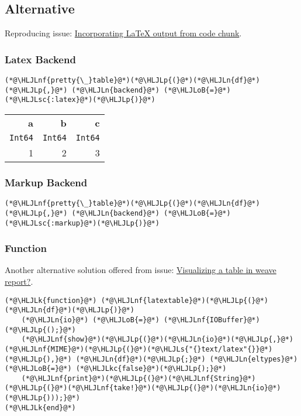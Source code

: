 \documentclass[12pt,a4paper]{article}
\newcommand{\HLJLk}[1]{\textcolor[RGB]{148,91,176}{\textbf{#1}}}
\newcommand{\HLJLkc}[1]{\textcolor[RGB]{59,151,46}{\textit{#1}}}
\newcommand{\HLJLn}[1]{#1}
\newcommand{\HLJLnf}[1]{\textcolor[RGB]{66,102,213}{#1}}
\newcommand{\HLJLs}[1]{\textcolor[RGB]{201,61,57}{#1}}
\newcommand{\HLJLsc}[1]{\textcolor[RGB]{201,61,57}{#1}}
\newcommand{\HLJLoB}[1]{\textcolor[RGB]{102,102,102}{\textbf{#1}}}
\newcommand{\HLJLp}[1]{#1}
\begin{document}
\subsection{Alternative}
Reproducing issue: \href{https://github.com/JunoLab/Weave.jl/issues/276}{Incorporating LaTeX output from code chunk}.

\subsubsection{Latex Backend}

\begin{lstlisting}
(*@\HLJLnf{pretty{\_}table}@*)(*@\HLJLp{(}@*)(*@\HLJLn{df}@*)(*@\HLJLp{,}@*) (*@\HLJLn{backend}@*) (*@\HLJLoB{=}@*) (*@\HLJLsc{:latex}@*)(*@\HLJLp{)}@*)
\end{lstlisting}

\begin{table}
  \begin{tabular}{rrr}
    \hline\hline
    \textbf{a} & \textbf{b} & \textbf{c} \\
    \texttt{Int64} & \texttt{Int64} & \texttt{Int64} \\\hline
    1 & 2 & 3 \\\hline\hline
  \end{tabular}
\end{table}


\subsubsection{Markup Backend}

\begin{lstlisting}
(*@\HLJLnf{pretty{\_}table}@*)(*@\HLJLp{(}@*)(*@\HLJLn{df}@*)(*@\HLJLp{,}@*) (*@\HLJLn{backend}@*) (*@\HLJLoB{=}@*) (*@\HLJLsc{:markup}@*)(*@\HLJLp{)}@*)
\end{lstlisting}


\subsubsection{Function}
Another alternative solution offered from issue: \href{https://github.com/JunoLab/Weave.jl/issues/200}{Visualizing a table in weave report?}.


\begin{lstlisting}
(*@\HLJLk{function}@*) (*@\HLJLnf{latextable}@*)(*@\HLJLp{(}@*)(*@\HLJLn{df}@*)(*@\HLJLp{)}@*)
    (*@\HLJLn{io}@*) (*@\HLJLoB{=}@*) (*@\HLJLnf{IOBuffer}@*)(*@\HLJLp{();}@*)
    (*@\HLJLnf{show}@*)(*@\HLJLp{(}@*)(*@\HLJLn{io}@*)(*@\HLJLp{,}@*) (*@\HLJLnf{MIME}@*)(*@\HLJLp{(}@*)(*@\HLJLs{"{}text/latex"{}}@*)(*@\HLJLp{),}@*) (*@\HLJLn{df}@*)(*@\HLJLp{;}@*) (*@\HLJLn{eltypes}@*) (*@\HLJLoB{=}@*) (*@\HLJLkc{false}@*)(*@\HLJLp{);}@*)
    (*@\HLJLnf{print}@*)(*@\HLJLp{(}@*)(*@\HLJLnf{String}@*)(*@\HLJLp{(}@*)(*@\HLJLnf{take!}@*)(*@\HLJLp{(}@*)(*@\HLJLn{io}@*)(*@\HLJLp{)));}@*)
(*@\HLJLk{end}@*)
\end{lstlisting}
\end{document}
